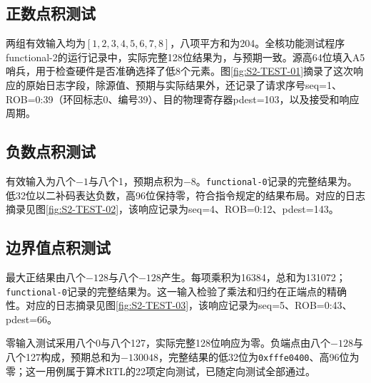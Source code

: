 \subsection{正数点积测试}
两组有效输入均为$[1,2,3,4,5,6,7,8]$，八项平方和为204。全核功能测试程序functional-2的运行记录中，实际完整128位结果为，与预期一致。源高64位填入A5哨兵，用于检查硬件是否准确选择了低8个元素。图\ref{fig:S2-TEST-01}摘录了这次响应的原始日志字段，除源值、预期与实际结果外，还记录了请求序号seq=1、ROB=0:39（环回标志0、编号39）、目的物理寄存器pdest=103，以及接受和响应周期。


\subsection{负数点积测试}
有效输入为八个$-1$与八个1，预期点积为$-8$。\texttt{functional-0}记录的完整结果为。低32位以二补码表达负数，高96位保持零，符合指令规定的结果布局。对应的日志摘录见图\ref{fig:S2-TEST-02}，该响应记录为seq=4、ROB=0:12、pdest=143。


\subsection{边界值点积测试}
最大正结果由八个$-128$与八个$-128$产生。每项乘积为16384，总和为131072；\texttt{functional-0}记录的完整结果为。这一输入检验了乘法和归约在正端点的精确性。对应的日志摘录见图\ref{fig:S2-TEST-03}，该响应记录为seq=5、ROB=0:43、pdest=66。


零输入测试采用八个0与八个127，实际完整128位响应为零。负端点由八个$-128$与八个127构成，预期总和为$-130048$，完整结果的低32位为\texttt{0xfffe0400}、高96位为零；这一用例属于算术RTL的22项定向测试，已随定向测试全部通过。

